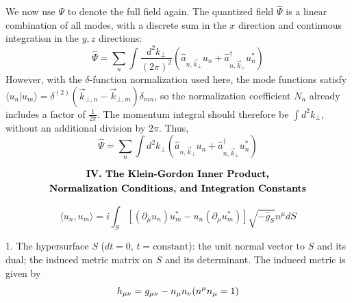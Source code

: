\documentclass[english]{article}
\begin{document}
We now use $\Psi$ to denote the full field again. The quantized field
$\hat{\Psi}$ is a linear combination of all modes, with a discrete
sum in the $x$ direction and continuous integration in the $y,z$
directions: 
\[
\hat{\Psi}=\sum_{n}\int\frac{d^{2}k_{\perp}}{(2\pi)^{2}}\left(\hat{a}_{n,\vec{k}_{\perp}}u_{n}+\hat{a}^{\dagger}_{n,\vec{k}_{\perp}}u^{*}_{n}\right)
\]
 However, with the $\delta$-function normalization used here, the
mode functions satisfy $\langle u_{n}\vert u_{m}\rangle=\delta^{(2)}\left(\vec{k}_{\bot,n}-\vec{k}_{\bot,m}\right)\delta_{mn}$,
so the normalization coefficient $N_{n}$ already includes a factor
of $\frac{1}{2\pi}$. The momentum integral should therefore be $\int d^{2}k_{\perp}$,
without an additional division by $2\pi$. Thus, 
\[
\hat{\Psi}=\sum_{n}\int d^{2}k_{\perp}\left(\hat{a}_{n,\vec{k}_{\perp}}u_{n}+\hat{a}^{\dagger}_{n,\vec{k}_{\perp}}u^{*}_{n}\right)
\]

\Needspace{110pt}\par\addvspace{20pt}\noindent\begin{minipage}{\linewidth}\begingroup\fontsize{12}{15}\selectfont\setlength{\abovedisplayskip}{0pt}\setlength{\belowdisplayskip}{0pt}\setlength{\abovedisplayshortskip}{0pt}\setlength{\belowdisplayshortskip}{0pt}
\[
\begin{gathered}\text{\bfseries IV. The Klein-Gordon Inner Product,}\\
\text{\bfseries Normalization Conditions, and Integration Constants}
\end{gathered}
\]
\endgroup\end{minipage}\par\nopagebreak[4]\vspace{20pt}\nopagebreak[4]

\[
\langle u_{n},u_{m}\rangle=i\int_{S}\left[\left(\partial_{\mu}u_{n}\right)u^{*}_{m}-u_{n}\left(\partial_{\mu}u^{*}_{m}\right)\right]\sqrt{-\hat{g}_{S}}n^{\mu}dS
\]

1. The hypersurface $S$ ($dt=0$, $t=\text{constant}$): the unit
normal vector to $S$ and its dual; the induced metric matrix on $S$
and its determinant. The induced metric is given by 
\[
h_{\mu\nu}=g_{\mu\nu}-n_{\mu}n_{\nu}\hfill(n^{\mu}n_{\mu}=1)
\]
\end{document}
